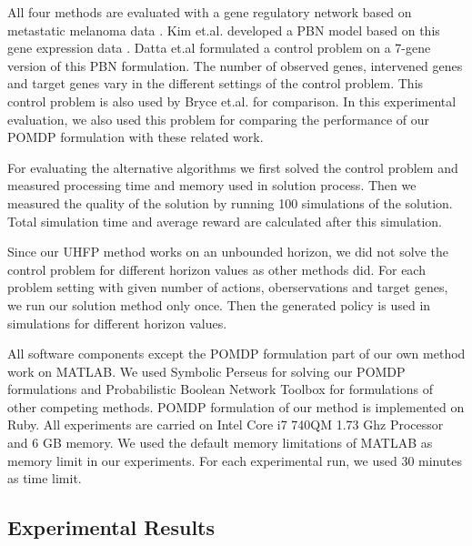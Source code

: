 All four methods are evaluated with a gene regulatory network based on metastatic melanoma data \cite{Bittner00}. 
Kim et.al.  developed a PBN model based on this gene expression data \cite{Kim02}. Datta et.al 
formulated a control problem on a 7-gene version of this PBN formulation. The number of observed genes,
 intervened genes and target genes vary in the different settings of the control problem. This control 
problem is also used by Bryce et.al. for comparison. In this experimental evaluation, we also used this 
problem for comparing the performance of our POMDP formulation with these related work.

For evaluating the alternative algorithms we first solved the control problem and measured processing 
time and memory used in solution process. Then we measured the quality of the solution by running 100 simulations of 
the solution. Total simulation time and average reward are calculated after this simulation.

Since our \textsc{UHFP} method works on an unbounded horizon, we did not solve the control problem for different horizon
values as other methods did. For each problem setting with given number of actions, oberservations and target genes,
we run our solution method only once. Then the generated policy is used in simulations for different horizon
values.

All software components except the POMDP formulation part of our own method work on MATLAB. We used Symbolic 
Perseus for solving our POMDP formulations and Probabilistic Boolean Network Toolbox for formulations 
of other competing methods. POMDP formulation of our method is implemented on Ruby. All experiments are 
carried on Intel Core i7 740QM 1.73 Ghz Processor and 6 GB memory. We used the default memory limitations of MATLAB
as memory limit in our experiments. For each experimental run, we used 30 minutes as time limit.

\subsection{Experimental Results}

